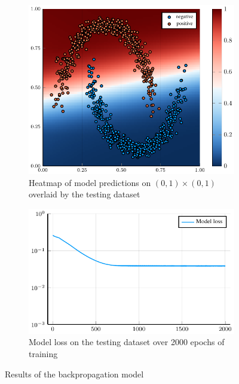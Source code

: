 \begin{figure}
	\centering
	\begin{subfigure}{0.49\textwidth}
		\centering
		\includegraphics[width=\textwidth]{images/backprop-heatmap/backprop.pdf}
		\caption{Heatmap of model predictions on \( \left( 0, 1 \right) \times \left( 0, 1 \right) \) overlaid by the testing dataset}
	\end{subfigure}
	\begin{subfigure}{0.49\textwidth}
		\centering
		\includegraphics[width=\textwidth]{images/backprop-modelloss/backprop.pdf}
		\caption{Model loss on the testing dataset over 2000 epochs of training}
	\end{subfigure}
	\caption{Results of the backpropagation model}\label{backprop_model}
\end{figure}

